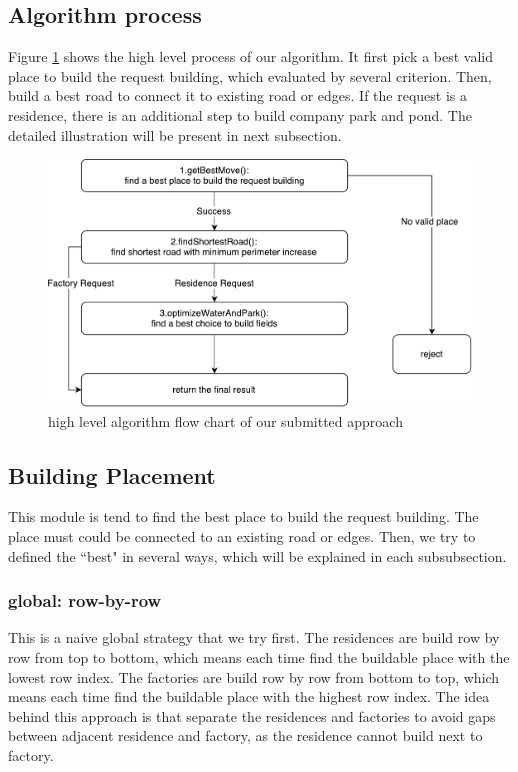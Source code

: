 \subsection{Algorithm process}
Figure \ref{fig:pentos} shows the high level process of our algorithm. It first pick a best valid place to build the request building, which evaluated by several criterion. Then, build a best road to connect it to existing road or edges. If the request is a residence, there is an additional step to build company park and pond. The detailed illustration will be present in next subsection.

\begin{figure}
\center
\includegraphics[scale=0.5]{pentos.pdf}
\caption{high level algorithm flow chart of our submitted approach}
\label{fig:pentos}
\end{figure}

\subsection{Building Placement}
This module is tend to find the best place to build the request building. The place must could be connected to an existing road or edges. Then, we try to defined the ``best" in several ways, which will be explained in each subsubsection.
\subsubsection{global: row-by-row}
This is a naive global strategy that we try first. The residences are build row by row from top to bottom, which means each time find the buildable place with the lowest row index. The factories are build row by row from bottom to top, which means each time find the buildable place with the highest row index. The idea behind this approach is that separate the residences and factories to avoid gaps between adjacent residence and factory, as the residence cannot build next to factory.

